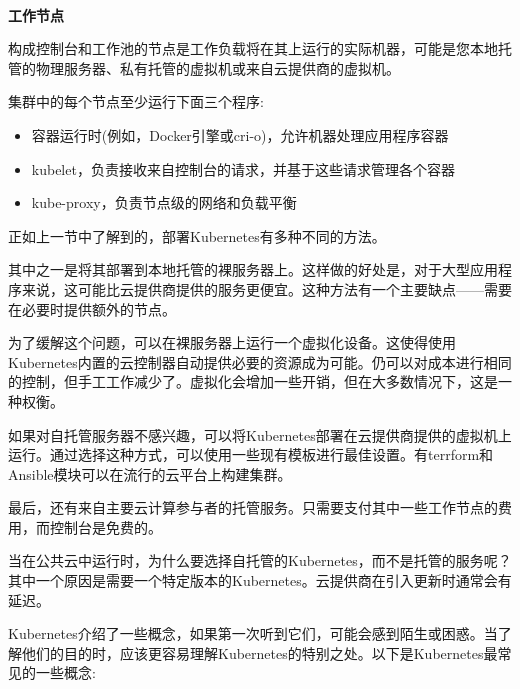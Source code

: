 \hspace*{\fill} \\ %
\noindent
\textbf{工作节点}

构成控制台和工作池的节点是工作负载将在其上运行的实际机器，可能是您本地托管的物理服务器、私有托管的虚拟机或来自云提供商的虚拟机。

集群中的每个节点至少运行下面三个程序:

\begin{itemize}
\item 
容器运行时(例如，Docker引擎或cri-o)，允许机器处理应用程序容器

\item 
kubelet，负责接收来自控制台的请求，并基于这些请求管理各个容器

\item 
kube-proxy，负责节点级的网络和负载平衡
\end{itemize}


正如上一节中了解到的，部署Kubernetes有多种不同的方法。

其中之一是将其部署到本地托管的裸服务器上。这样做的好处是，对于大型应用程序来说，这可能比云提供商提供的服务更便宜。这种方法有一个主要缺点——需要在必要时提供额外的节点。

为了缓解这个问题，可以在裸服务器上运行一个虚拟化设备。这使得使用Kubernetes内置的云控制器自动提供必要的资源成为可能。仍可以对成本进行相同的控制，但手工工作减少了。虚拟化会增加一些开销，但在大多数情况下，这是一种权衡。

如果对自托管服务器不感兴趣，可以将Kubernetes部署在云提供商提供的虚拟机上运行。通过选择这种方式，可以使用一些现有模板进行最佳设置。有terrform和Ansible模块可以在流行的云平台上构建集群。

最后，还有来自主要云计算参与者的托管服务。只需要支付其中一些工作节点的费用，而控制台是免费的。

当在公共云中运行时，为什么要选择自托管的Kubernetes，而不是托管的服务呢？其中一个原因是需要一个特定版本的Kubernetes。云提供商在引入更新时通常会有延迟。


Kubernetes介绍了一些概念，如果第一次听到它们，可能会感到陌生或困惑。当了解他们的目的时，应该更容易理解Kubernetes的特别之处。以下是Kubernetes最常见的一些概念:

